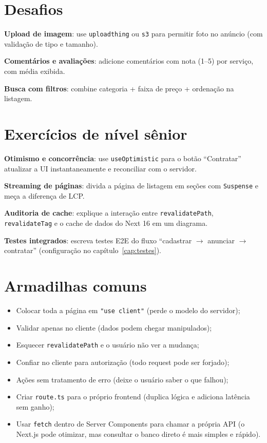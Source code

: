 \section{Desafios}

\begin{desafios}
  \item \textbf{Upload de imagem}: use \texttt{uploadthing} ou \texttt{s3} para permitir foto no anúncio (com validação de tipo e tamanho).
  \item \textbf{Comentários e avaliações}: adicione comentários com nota (1--5) por serviço, com média exibida.
  \item \textbf{Busca com filtros}: combine categoria + faixa de preço + ordenação na listagem.
\end{desafios}

\section{Exercícios de nível sênior}

\begin{seniores}
  \item \textbf{Otimismo e concorrência}: use \texttt{useOptimistic} para o botão ``Contratar'' atualizar a UI instantaneamente e reconciliar com o servidor.
  \item \textbf{Streaming de páginas}: divida a página de listagem em seções com \texttt{Suspense} e meça a diferença de LCP.
  \item \textbf{Auditoria de cache}: explique a interação entre \texttt{revalidatePath}, \texttt{revalidateTag} e o cache de dados do Next 16 em um diagrama.
  \item \textbf{Testes integrados}: escreva testes E2E do fluxo ``cadastrar $\rightarrow$ anunciar $\rightarrow$ contratar'' (configuração no capítulo~\ref{cap:testes}).
\end{seniores}

\section{Armadilhas comuns}

\begin{itemize}[leftmargin=*, itemsep=0.4em]
  \item Colocar toda a página em \texttt{"use client"} (perde o modelo do servidor);
  \item Validar apenas no cliente (dados podem chegar manipulados);
  \item Esquecer \texttt{revalidatePath} e o usuário não ver a mudança;
  \item Confiar no cliente para autorização (todo request pode ser forjado);
  \item Ações sem tratamento de erro (deixe o usuário saber o que falhou);
  \item Criar \texttt{route.ts} para o próprio frontend (duplica lógica e adiciona latência sem ganho);
  \item Usar \texttt{fetch} dentro de Server Components para chamar a própria API (o Next.js pode otimizar, mas consultar o banco direto é mais simples e rápido).
\end{itemize}

